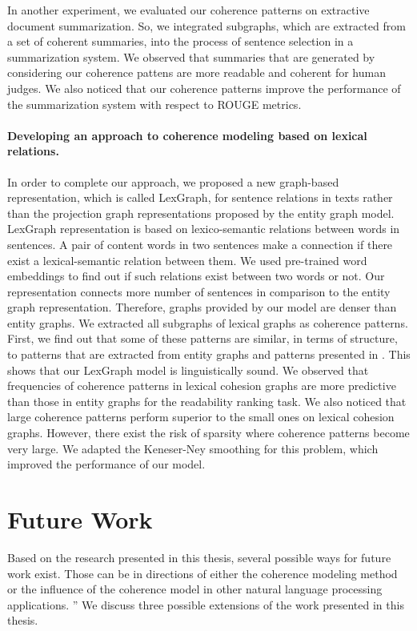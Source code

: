 In another experiment, we evaluated our coherence patterns on extractive document summarization. 
So, we integrated subgraphs, which are extracted from a set of coherent summaries, into the process of sentence selection in a summarization system. 
We observed that summaries that are generated by considering our coherence pattens are more readable and coherent for human judges. 
We also noticed that our coherence patterns improve the performance of the summarization system with respect to ROUGE metrics. 

\paragraph{Developing an approach to coherence modeling based on lexical relations.} 
In order to complete our approach, we proposed a new graph-based representation, which is called LexGraph, for sentence relations in texts rather than the projection graph representations proposed by the entity graph model.   
LexGraph representation is based on lexico-semantic relations between words in sentences.
A pair of content words in two sentences make a connection if there exist a lexical-semantic relation between them. 
We used pre-trained word embeddings to find out if such relations exist between two words or not.  
Our representation connects more number of sentences in comparison to the entity graph representation. 
Therefore, graphs provided by our model are denser than entity graphs. 
We extracted all subgraphs of lexical graphs as coherence patterns. 
First, we find out that some of these patterns are similar, in terms of structure, to patterns that are extracted from entity graphs and patterns presented in .
This shows that our LexGraph model is linguistically sound. 
We observed that frequencies of coherence patterns in lexical cohesion graphs are more predictive than those in entity graphs for the readability ranking task. 
We also noticed that large coherence patterns perform superior to the small ones on lexical cohesion graphs.  
However, there exist the risk of sparsity where coherence patterns become very large. 
We adapted the Keneser-Ney smoothing for this problem, which improved the performance of our model. 

\section{Future Work}
\label{sec:conc-future_work}

Based on the research presented in this thesis, several possible ways for future work exist. 
Those can be in directions of either the coherence modeling method or the influence of the coherence model in other natural language processing applications. ''   
We discuss three possible extensions of the work presented in this thesis. 

